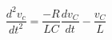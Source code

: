 \documentclass[preview]{standalone}
\begin{document}
\begin{center}
\[\frac{d^2v_c}{dt^2} = \frac{-R}{LC} \frac{dv_C}{dt} - \frac{v_C}{L} \]
\end{center}
\end{document}
